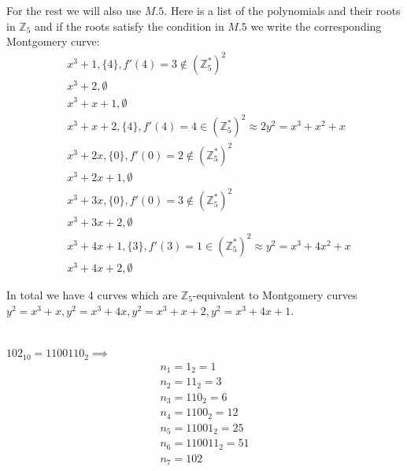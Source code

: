 \documentclass[12pt, a4paper]{article}
\begin{document}
For the rest we will also use $M.5$. Here is a list of the polynomials and their roots in $\mathbb{Z}_5$ and if the roots satisfy the condition in $M.5$ we write the corresponding Montgomery curve:
\begin{align*}
& x^3+1,\{4\}, f'(4) = 3 \notin (\mathbb{Z}_5^*)^2\\
& x^3+2, \emptyset \\
& x^3 + x + 1, \emptyset \\
& x^3 + x + 2, \{4\}, f'(4) = 4 \in (\mathbb{Z}_5^*)^2 \approx 2y^2=x^3+x^2+x\\
& x^3 + 2x, \{0\}, f'(0) = 2 \notin (\mathbb{Z}_5^*)^2\\
& x^3 + 2x+1, \emptyset\\
& x^3 +3x, \{0\}, f'(0) = 3 \notin (\mathbb{Z}_5^*)^2\\
& x^3 +3x+2, \emptyset\\
& x^3 +4x+1, \{3\}, f'(3)=1 \in (\mathbb{Z}_5^*)^2 \approx y^2=x^3+4x^2+x\\
& x^3 +4x+2, \emptyset
\end{align*}

In total we have 4 curves which are $\mathbb{Z}_5$-equivalent to Montgomery curves $y^2=x^3+x, y^2=x^3+4x, y^2=x^3 + x + 2, y^2=x^3 +4x+1$.

\section{}
$102_{10} = 1100110_2 \implies$
\begin{gather*}
n_1 = 1_2 = 1\\
n_2 = 11_2 = 3\\
n_3 = 110_2 = 6\\
n_4 = 1100_2 = 12\\
n_5 = 11001_2 = 25\\
n_6 = 110011_2 = 51\\
n_7 = 102
\end{gather*}
\end{document}
